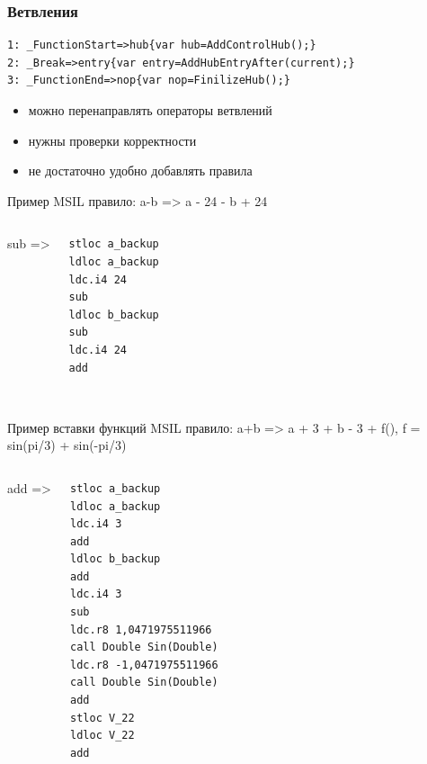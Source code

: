 \documentclass[10pt]{beamer}
\begin{document}
\begin{frame}[fragile]
\frametitle{Ветвления}
\begin{tcolorbox}[colback=green!5,colframe=green!40!black,title=пример]
\begin{verbatim}
1: _FunctionStart=>hub{var hub=AddControlHub();}
2: _Break=>entry{var entry=AddHubEntryAfter(current);}
3: _FunctionEnd=>nop{var nop=FinilizeHub();}
\end{verbatim}
\end{tcolorbox}
\begin{itemize}
  \item можно перенаправлять операторы ветвлений
  \item нужны проверки корректности
  \item не достаточно удобно добавлять правила
\end{itemize}
\end{frame}

\begin{frame}[fragile]{Пример MSIL}
правило: a-b => a - 24 - b + 24
\begin{columns}
 

sub =>

\begin{tcolorbox}[colback=green!5,colframe=green!40!black,title=результат]
\begin{verbatim}
stloc a_backup
ldloc a_backup
ldc.i4 24
sub
ldloc b_backup
sub
ldc.i4 24
add


\end{verbatim}
\end{tcolorbox}
\end{columns}
\end{frame}

\begin{frame}[fragile]{Пример вставки функций MSIL}
правило: a+b => a + 3 + b - 3 + f(), f = sin(pi/3) + sin(-pi/3)
\begin{columns}
 

add =>

\begin{tcolorbox}[colback=green!5,colframe=green!40!black,title=результат]
\begin{multicols*}{2}
\begin{verbatim}
stloc a_backup
ldloc a_backup
ldc.i4 3
add
ldloc b_backup
add
ldc.i4 3
sub
ldc.r8 1,0471975511966
call Double Sin(Double)
ldc.r8 -1,0471975511966
call Double Sin(Double)
add
stloc V_22
ldloc V_22
add
\end{verbatim}
\end{multicols*}
\end{tcolorbox}
\end{columns}
\end{frame}
\end{document}
